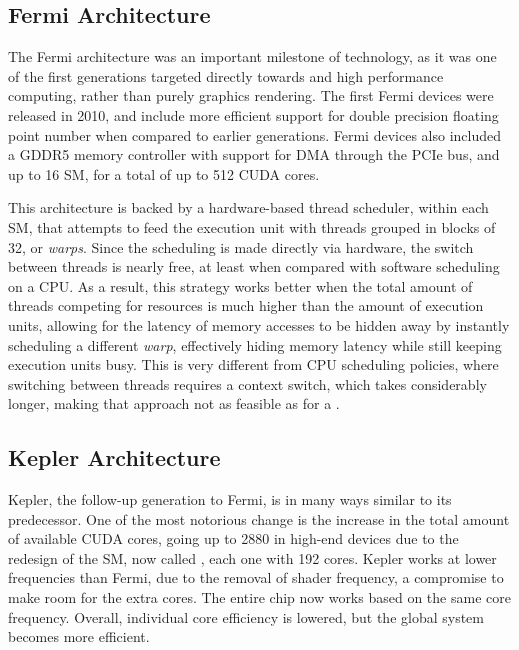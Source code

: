 \documentclass[main.tex]{subfiles}
\begin{document}
\subsection{Fermi Architecture}

The Fermi architecture was an important milestone of \gpus technology, as it was one of the first generations targeted directly towards \gpgpu and high performance computing, rather than purely graphics rendering. The first Fermi devices were released in 2010, and include more efficient support for double precision floating point number when compared to earlier generations. Fermi devices also included a GDDR5 memory controller with support for \ac{DMA} through the \acs{PCIe} bus, and up to 16 \acf{SM}, for a total of up to 512 \acs{CUDA} cores.


This architecture is backed by a hardware-based thread scheduler, within each \acs{SM}, that attempts to feed the execution unit with threads grouped in blocks of 32, or \textit{warps}. Since the scheduling is made directly via hardware, the switch between threads is nearly free, at least when compared with software scheduling on a \acs{CPU}. As a result, this strategy works better when the total amount of threads competing for resources is much higher than the amount of execution units, allowing for the latency of memory accesses to be hidden away by instantly scheduling a different \textit{warp}, effectively hiding memory latency while still keeping execution units busy. This is very different from \acs{CPU} scheduling policies, where switching between threads requires a context switch, which takes considerably longer, making that approach not as feasible as for a \gpu.


\subsection{Kepler Architecture}

Kepler, the follow-up generation to Fermi, is in many ways similar to its predecessor. One of the most notorious change is the increase in the total amount of available CUDA cores, going up to 2880 in high-end devices due to the redesign of the \acl{SM}, now called \smx, each one with 192 \cuda cores. Kepler works at lower frequencies than Fermi, due to the removal of shader frequency, a compromise to make room for the extra \cuda cores. The entire chip now works based on the same core frequency. Overall, individual core efficiency is lowered, but the global system becomes more efficient.
\end{document}
